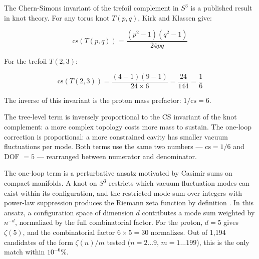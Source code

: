 The Chern-Simons invariant of the trefoil complement in $S^3$ is a published result in knot theory. For any torus knot $T(p,q)$, Kirk and Klassen \cite{kirkklassen1993} give:

$$\mathrm{cs}(T(p,q)) = \frac{(p^2-1)(q^2-1)}{24pq}$$

For the trefoil $T(2,3)$:

$$\mathrm{cs}(T(2,3)) = \frac{(4-1)(9-1)}{24 \times 6} = \frac{24}{144} = \frac{1}{6}$$

The inverse of this invariant is the proton mass prefactor: $1/\mathrm{cs} = 6$.

\begin{center}
\end{center}

\medskip
The tree-level term is inversely proportional to the CS invariant of the knot complement: a more complex topology costs more mass to sustain. The one-loop correction is proportional: a more constrained cavity has smaller vacuum fluctuations per mode. Both terms use the same two numbers --- $\mathrm{cs} = 1/6$ and DOF $= 5$ --- rearranged between numerator and denominator.

The one-loop term is a perturbative ansatz motivated by Casimir sums on compact manifolds. A knot on $S^3$ restricts which vacuum fluctuation modes can exist within its configuration, and the restricted mode sum over integers with power-law suppression produces the Riemann zeta function by definition \cite{hawking1977}. In this ansatz, a configuration space of dimension $d$ contributes a mode sum weighted by $n^{-d}$, normalized by the full combinatorial factor. For the proton, $d = 5$ gives $\zeta(5)$, and the combinatorial factor $6 \times 5 = 30$ normalizes. Out of 1{,}194 candidates of the form $\zeta(n)/m$ tested ($n = 2 \ldots 9$, $m = 1 \ldots 199$), this is the only match within $10^{-6}$\%.

